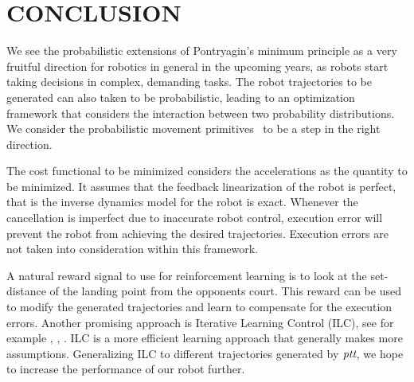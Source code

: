 \documentclass[letterpaper, 10 pt, conference]{ieeeconf}
\newcommand{\alg}{\emph{ptt}} %
\begin{document}

\section{CONCLUSION}\label{end}

We see the probabilistic extensions of Pontryagin's minimum principle as a very fruitful direction for robotics in general in the upcoming years, as robots start taking decisions in complex, demanding tasks. The robot trajectories to be generated can also taken to be probabilistic, leading to an optimization framework that considers the interaction between two probability distributions. We consider the probabilistic movement primitives~\cite{Paraschos13} to be a step in the right direction.


The cost functional to be minimized considers the accelerations as the quantity to be minimized. It assumes that the feedback linearization of the robot is perfect, that is the inverse dynamics model for the robot is exact. Whenever the cancellation is imperfect due to inaccurate robot control, execution error will prevent the robot from achieving the desired trajectories. Execution errors are not taken into consideration within this framework. 

A natural reward signal to use for reinforcement learning is to look at the set-distance of the landing point from the opponents court. This reward can be used to modify the generated trajectories and learn to compensate for the execution errors. Another promising approach is Iterative Learning Control (ILC), see for example \cite{Bristow06}, \cite{Longman2000}, \cite{Koc15}. ILC is a more efficient learning approach that generally makes more assumptions. Generalizing ILC to different trajectories generated by $\alg$, we hope to increase the performance of our robot further. 


%
%

\end{document}
